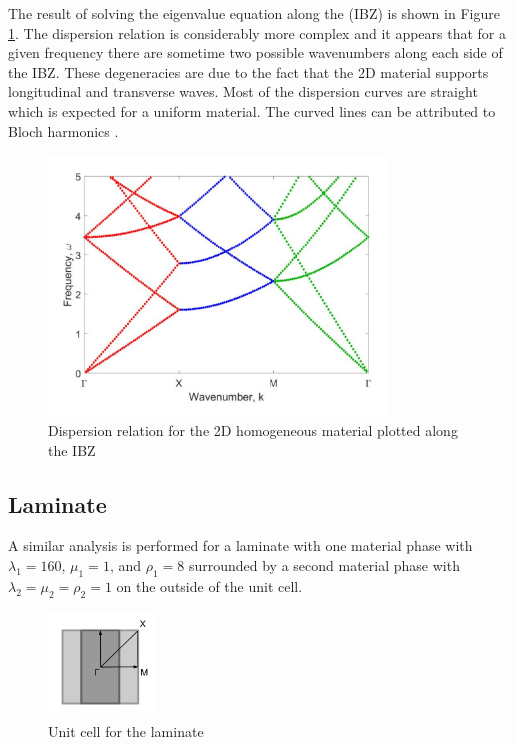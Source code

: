 \documentclass{article}
\begin{document}
The result of solving the eigenvalue equation along the (IBZ) is shown in 
Figure \ref{fig:twodunif}. The dispersion relation is considerably more complex 
and it appears that for a given frequency there are sometime two possible 
wavenumbers along each side of the IBZ. These degeneracies are due to the fact 
that the 2D material supports longitudinal and transverse waves. Most of the 
dispersion curves are straight which is expected for a uniform material. The 
curved lines can be attributed to Bloch harmonics \cite{veres13}.
\begin{figure}[!htbp]
	\centering
	\includegraphics[width=0.8\textwidth]{twodunif.pdf}
	\caption{Dispersion relation for the 2D homogeneous material plotted along 
	the IBZ}
	\label{fig:twodunif}
\end{figure}

\subsection{Laminate}
A similar analysis is performed for a laminate with one material phase with 
$\lambda_1 = 160$, $\mu_1 = 1$, and $\rho_1 = 8$ surrounded by a second 
material phase with $\lambda_2 = \mu_2 = \rho_2 = 1$ on the outside of the unit 
cell.
\begin{figure}[!htbp]
	\centering
	\includegraphics[width=0.25\textwidth]{twodlayrdcell.pdf}
	\caption{Unit cell for the laminate}
	\label{fig:twodlayrdcell}
\end{figure}
\end{document}
